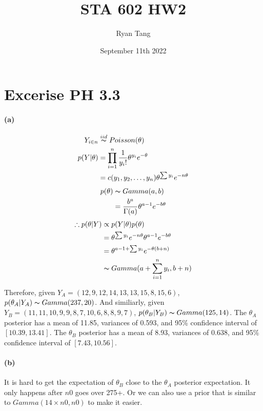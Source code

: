 \documentclass[11pt, letterpaper]{article}
\title{STA 602 HW2}
\author{Ryan Tang}
\date{September 11th 2022}
\begin{document}
\maketitle

\section{Excerise PH 3.3}
\paragraph{(a)}
\begin{align*}
  Y_{i \in n} &\overset{iid}{\thicksim} Poisson(\theta) \\
  p(Y|\theta) &= \prod_{i=1}^{n} \frac{1}{y_i!} \theta^{y_i} e^{-\theta} \\
    &= c(y_1, y_2, \dots, y_n) \theta^{\sum y_i} e^{-n\theta}
\end{align*}
\begin{align*}
  p(\theta) &\thicksim Gamma(a, b) \\
    &= \frac{b^a}{\Gamma(a)} \theta^{a-1} e^{-b\theta}
\end{align*}
\begin{align*}
  \therefore p(\theta|Y) &\propto p(Y|\theta) p(\theta) \\
    &= \theta^{\sum y_i} e^{-n\theta} \theta^{a-1} e^{-b\theta} \\
    &= \theta^{a - 1 + \sum y_i} e^{-\theta(b+n)} \\
    &\thicksim Gamma(a + \sum_{i=1}^{n} y_i, b + n)
\end{align*}

Therefore, given $Y_A = (12, 9, 12, 14, 13, 13, 15, 8, 15, 6)$, $p(\theta_A|Y_A) \thicksim Gamma(237, 20)$.
And similiarly, given $Y_B = (11, 11, 10, 9, 9, 8, 7, 10, 6, 8, 8, 9, 7)$, $p(\theta_B|Y_B) \thicksim Gamma(125, 14)$.
The $\theta_A$ posterior has a mean of 11.85, variances of 0.593, and 95\% confidence interval of $[10.39, 13.41]$.
The $\theta_B$ posterior has a mean of 8.93, variances of 0.638, and 95\% confidence interval of $[7.43, 10.56]$.

\newpage
\paragraph{(b)}
It is hard to get the expectation of $\theta_B$ close to the $\theta_A$ posterior expectation. It only happens
after $n0$ goes over 275+. Or we can also use a prior that is similar to $Gamma(14 \times n0, n0)$ to make it easier.
\end{document}
